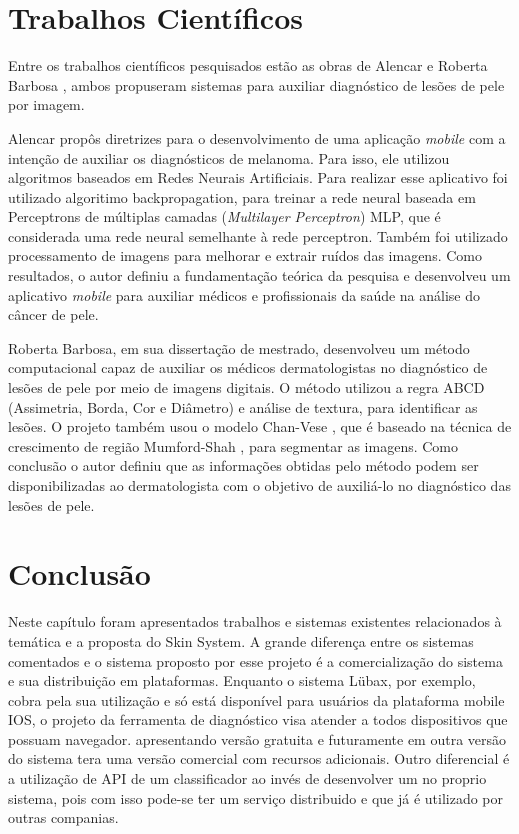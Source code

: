 \documentclass[openright]{ifrs} %
\begin{document}
\section{Trabalhos Científicos}

Entre os trabalhos científicos pesquisados estão as obras de Alencar  \citeyearpar{alencar2015desenvolvimento} e  Roberta Barbosa \citeyearpar{oliveira2012metodo}, ambos propuseram sistemas para auxiliar diagnóstico de lesões de pele por imagem. \par

Alencar propôs diretrizes para o desenvolvimento de uma aplicação \textit{mobile} com a intenção de auxiliar os diagnósticos de melanoma. Para isso, ele utilizou algoritmos  baseados em Redes Neurais Artificiais. Para realizar esse aplicativo foi utilizado algoritimo  
backpropagation, para treinar a rede neural baseada em Perceptrons de múltiplas camadas (\textit{Multilayer Perceptron}) MLP, que é considerada uma rede neural semelhante à rede perceptron. Também foi utilizado processamento de imagens para melhorar e extrair ruídos das imagens. Como resultados, o autor definiu a fundamentação teórica da pesquisa e desenvolveu um aplicativo \textit{mobile} para  auxiliar médicos e profissionais da saúde na análise do câncer de pele.



 Roberta Barbosa, em sua dissertação de mestrado, desenvolveu um
 método computacional capaz de auxiliar os médicos
dermatologistas no diagnóstico de lesões de pele por meio de imagens digitais. O método utilizou a regra ABCD (Assimetria, Borda, Cor e Diâmetro) e análise de textura, para identificar as
lesões. O projeto também usou o modelo Chan-Vese \cite{brown2012completely}, 
que é baseado na técnica de crescimento de região Mumford-Shah \cite{chan2001level}, para segmentar as imagens. Como conclusão o autor definiu que as informações obtidas pelo método podem ser disponibilizadas ao dermatologista com o objetivo de auxiliá-lo no diagnóstico das lesões de pele.


\section{Conclusão}

Neste capítulo foram apresentados trabalhos e sistemas existentes relacionados à temática e a proposta do Skin System. A grande diferença entre os sistemas comentados e o sistema proposto por esse projeto é a comercialização do sistema e sua distribuição em plataformas. Enquanto o sistema Lübax, por exemplo, cobra pela sua utilização e só está disponível para usuários da plataforma mobile IOS, o projeto da ferramenta de diagnóstico visa atender a todos dispositivos que possuam navegador. apresentando versão gratuita e futuramente em outra versão do sistema tera uma versão comercial com recursos adicionais. Outro diferencial é a utilização de API de um classificador ao invés de desenvolver um no proprio sistema, pois com isso pode-se ter um serviço distribuido e que já  é utilizado por outras companias.
\end{document}
